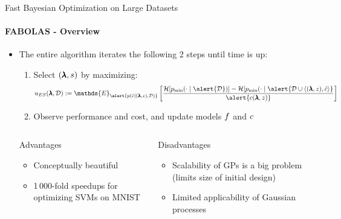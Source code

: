 \begin{frame}[c]{Fast Bayesian Optimization on Large Datasets}
\framesubtitle{FABOLAS - Overview}

\begin{itemize}
    \item The entire algorithm iterates the following 2 steps until time is up:
		\begin{enumerate}
			\item Select $(\pmb{\lambda},s)$ by maximizing:
    			\[{\acq}_{ES}(\conf,\dataset) := \mathds{E}_{\alert{p(\tilde{\cost}\mid (\conf, z), \dataset)}} 
            	\left[   \frac{\mathcal{H}[p_{\text{min}}(\cdot \mid \alert{\dataset})] - \mathcal{H}[p_{\text{min}}(\cdot \mid \alert{\dataset \cup \left\langle (\conf,z), \tilde{\cost} \right\rangle}}{\alert{c(\conf,z)}} \right]\]
			\item Observe performance and cost, and update models $f$ and $c$ 
		\end{enumerate}

\pause

\begin{columns}[T] %
\begin{column}{.48\textwidth}


    \begin{block}{Advantages}
    \begin{itemize}
    	\item Conceptually beautiful
    	\item 1\,000-fold speedups for optimizing SVMs on MNIST
    \end{itemize}
    \end{block}
\pause
\end{column}%

\hfill%

\begin{column}{.48\textwidth}

    \begin{block}{Disadvantages}
    \begin{itemize}
    	\item \alert{Scalability} of GPs is a big problem (limits size of initial design)
    	\item Limited applicability of Gaussian processes
    \end{itemize}
\end{block}

\end{column}
\end{columns}   

\end{itemize}
\end{frame}


